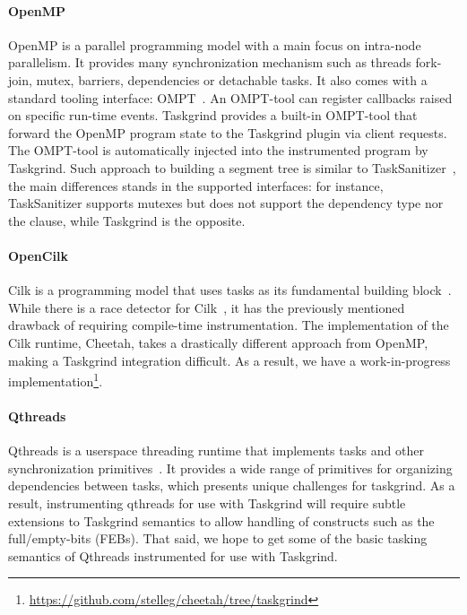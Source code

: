 \paragraph{OpenMP}
OpenMP is a parallel programming model with a main focus on intra-node parallelism.
It provides many synchronization mechanism such as threads fork-join, mutex, barriers, dependencies or detachable tasks.
It also comes with a standard tooling interface: OMPT~\cite{ompt}.
An OMPT-tool can register callbacks raised on specific run-time events.
Taskgrind provides a built-in OMPT-tool that forward the OpenMP program state to the Taskgrind plugin via client requests.
The OMPT-tool is automatically injected into the instrumented program by Taskgrind.
Such approach to building a segment tree is similar to TaskSanitizer~\cite{Matar18}, the main differences stands in the supported interfaces: for instance, TaskSanitizer supports mutexes but does not support the  dependency type nor the  clause, while Taskgrind is the opposite.

\paragraph{OpenCilk}
Cilk is a programming model that uses tasks as its fundamental building block~\cite{cilk}.
While there is a race detector for Cilk~\cite{opencilk}, it has the previously mentioned drawback of requiring compile-time instrumentation.
The implementation of the Cilk runtime, Cheetah, takes a drastically different approach from OpenMP, making a Taskgrind integration difficult.
As a result, we have a work-in-progress implementation\footnote{\url{https://github.com/stelleg/cheetah/tree/taskgrind}}.

\paragraph{Qthreads}
Qthreads is a userspace threading runtime that implements tasks and other synchronization primitives~\cite{qthreads}. It provides a wide range of primitives for organizing dependencies between tasks, which presents unique challenges for taskgrind. As a result, instrumenting qthreads for use with Taskgrind will require subtle extensions to Taskgrind semantics to allow handling of constructs such as the full/empty-bits (FEBs). That said, we hope to get some of the basic tasking semantics of Qthreads instrumented for use with Taskgrind. 



